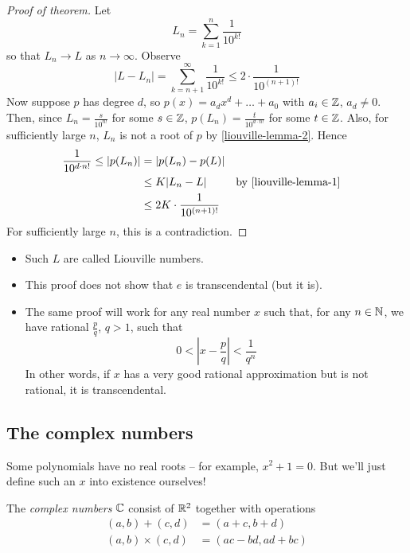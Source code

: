 \documentclass{../../template/note}
\begin{document}
    \begin{proof}[Proof of theorem]
        Let
        \[
            L_n = \sum_{k=1}^n \frac{1}{10^{k!}}
        \]
        so that \(L_n \to L\) as \(n \to \infty\). Observe
        \[
            |L-L_n| = \sum_{k=n+1}^\infty \frac{1}{10^{k!}} \leq 2 \cdot \frac{1}{10^{(n+1)!}}
        \]
        Now suppose \(p\) has degree \(d\), so \(p(x) = a_dx^d + \dots + a_0\) with \(a_i \in \mathbb Z\), \(a_d \neq 0\). Then, since \(L_n = \frac{s}{10^{n!}}\) for some \(s \in \mathbb Z\), \(p(L_n) = \frac{t}{10^{d \cdot n!}}\) for some \(t \in \mathbb Z\). Also, for sufficiently large \(n\), \(L_n\) is not a root of \(p\) by \cref{liouville-lemma-2}. Hence
        \begin{align*}
            \frac{1}{10^{d \cdot n!}} \leq |p(L_n)| &= |p(L_n)-p(L)| \\
            &\leq K|L_n-L| && \text{by \cref{liouville-lemma-1}} \\
            &\leq 2K \cdot \frac{1}{10^{(n+1)!}}
        \end{align*}
        For sufficiently large \(n\), this is a contradiction.
    \end{proof}
    
    \begin{remark*}
        \begin{itemize}
            \item Such \(L\) are called Liouville numbers.
            \item This proof does not show that \(e\) is transcendental (but it is).
            \item The same proof will work for any real number \(x\) such that, for any \(n \in \mathbb N\), we have rational \(\frac p q\), \(q > 1\), such that
            \[
                0 < \left|x-\frac p q\right| < \frac 1 {q^n}
            \]
            In other words, if \(x\) has a very good rational approximation but is not rational, it is transcendental.
        \end{itemize}
    \end{remark*}
    
    \subsection{The complex numbers}

    Some polynomials have no real roots -- for example, \(x^2+1=0\). But we'll just define such an \(x\) into existence ourselves!

    \begin{definition}
        The \emph{complex numbers} \(\mathbb C\) consist of \(\mathbb R^2\) together with operations
        \begin{align*}
            (a, b) + (c, d) &= (a + c, b + d) \\
            (a, b) \times (c, d) &= (ac - bd, ad + bc)
        \end{align*}
    \end{definition}
    
\end{document}
